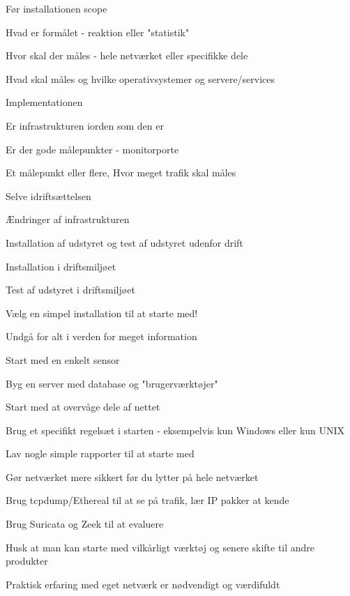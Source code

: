 \documentclass[Screen16to9,17pt]{foils}
\begin{document}
\begin{list1}
\item Før installationen scope
\begin{list2}
\item Hvad er formålet - reaktion eller "statistik"
\item Hvor skal der måles - hele netværket eller specifikke dele
\item Hvad skal måles og hvilke operativsystemer og servere/services
\end{list2}
\item Implementationen
\begin{list2}
\item Er infrastrukturen iorden som den er
\item Er der gode målepunkter - monitorporte
\item Et målepunkt eller flere, Hvor meget trafik skal måles
\end{list2}
\item Selve idriftsættelsen
\begin{list2}
\item Ændringer af infrastrukturen
\item Installation af udstyret og test af udstyret udenfor drift
\item Installation i driftsmiljøet
\item Test af udstyret i driftsmiljøet
\end{list2}
\end{list1}


\begin{list1}
\item Vælg en simpel installation til at starte med!
\item Undgå for alt i verden for meget information
\begin{list2}
\item Start med en enkelt sensor
\item Byg en server med database og "brugerværktøjer"
\item Start med at overvåge dele af nettet
\item Brug et specifikt regelsæt i starten - eksempelvis kun Windows eller kun UNIX
\item Lav nogle simple rapporter til at starte med
\end{list2}
\item Gør netværket mere sikkert før du lytter på hele netværket
\item Brug tcpdump/Ethereal til at se på trafik, lær IP pakker at
  kende
\item Brug Suricata og Zeek til at evaluere
\begin{list2}
\item Husk at man kan starte med vilkårligt værktøj og senere skifte til andre
produkter
\item Praktisk erfaring med eget netværk er nødvendigt og værdifuldt
\end{list2}
\end{list1}
\end{document}
